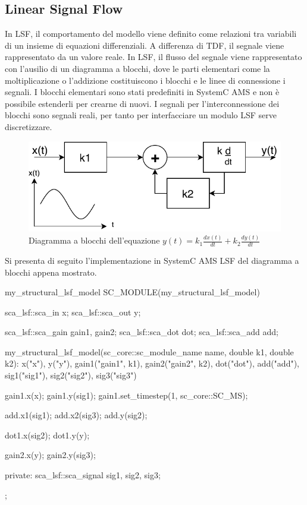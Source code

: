 \documentclass[10pt,a4paper,oneside]{scrbook}
\begin{document}
\subsection{Linear Signal Flow}
In LSF, il comportamento del modello viene definito come relazioni tra variabili di un insieme di equazioni differenziali.
A differenza di TDF, il segnale viene rappresentato da un valore reale.
In LSF, il flusso del segnale viene rappresentato con l'ausilio di un diagramma a blocchi, dove le parti elementari come 
la moltiplicazione o l'addizione costituiscono i blocchi e le linee di connessione i segnali.
I blocchi elementari sono stati predefiniti in SystemC AMS e non è possibile estenderli per crearne di nuovi. I segnali
per l'interconnessione dei blocchi sono segnali reali, per tanto per interfacciare un modulo LSF serve discretizzare.
\begin{figure}[h]
    \centering
    \includegraphics[width=1\linewidth]{"img/lsf"}
    \caption{Diagramma a blocchi dell'equazione $y(t)=k_1\frac{dx(t)}{dt}+k_2\frac{dy(t)}{dt}$}
    \label{fig:lsf}
\end{figure}

Si presenta di seguito l'implementazione in SystemC AMS LSF del diagramma a blocchi appena mostrato.
\begin{systemc}{my\_structural\_lsf\_model}
SC_MODULE(my_structural_lsf_model)
{
    sca_lsf::sca_in     x;
    sca_lsf::sca_out    y;
    
    sca_lsf::sca_gain   gain1, gain2;
    sca_lsf::sca_dot    dot;
    sca_lsf::sca_add    add;
    
    my_structural_lsf_model(sc_core::sc_module_name name,
                            double k1,
                            double k2):
        x("x"),
        y("y"),
        gain1("gain1", k1),
        gain2("gain2", k2),
        dot("dot"),
        add("add"),
        sig1("sig1"),
        sig2("sig2"),
        sig3("sig3")
    {
        gain1.x(x);
        gain1.y(sig1);
        gain1.set_timestep(1, sc_core::SC_MS);
        
        add.x1(sig1);
        add.x2(sig3);
        add.y(sig2);
        
        dot1.x(sig2);
        dot1.y(y);
        
        gain2.x(y);
        gain2.y(sig3);
    }
    
private:
    sca_lsf::sca_signal sig1, sig2, sig3;
};
\end{systemc}
\end{document}

